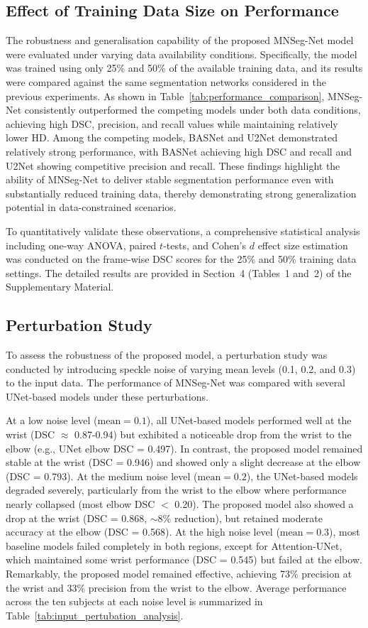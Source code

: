 \subsection{Effect of Training Data Size on Performance}
The robustness and generalisation capability of the proposed MNSeg-Net model were evaluated under varying data availability conditions. Specifically, the model was trained using only 25\% and 50\% of the available training data, and its results were compared against the same segmentation networks considered in the previous experiments. As shown in Table~\ref{tab:performance_comparison}, MNSeg-Net consistently outperformed the competing models under both data conditions, achieving high DSC, precision, and recall values while maintaining relatively lower HD. Among the competing models, BASNet and U2Net demonstrated relatively strong performance, with BASNet achieving high DSC and recall and U2Net showing competitive precision and recall. These findings highlight the ability of MNSeg-Net to deliver stable segmentation performance even with substantially reduced training data, thereby demonstrating strong generalization potential in data-constrained scenarios.

To quantitatively validate these observations, a comprehensive statistical
analysis including one-way ANOVA, paired $t$-tests, and Cohen’s $d$ effect size
estimation was conducted on the frame-wise DSC scores for the 25\% and 50\%
training data settings. The detailed results are provided in Section~4
(Tables~1 and~2) of the Supplementary Material.

\subsection{Perturbation Study}\label{sec:perturbation_study}

To assess the robustness of the proposed model, a perturbation study was conducted by introducing speckle noise of varying mean levels (0.1, 0.2, and 0.3) to the input data. The performance of MNSeg-Net was compared with several UNet-based models under these perturbations.

At a low noise level ($\text{mean}=0.1$), all UNet-based models performed well at the wrist (DSC $\approx$ 0.87-0.94) but exhibited a noticeable drop from the wrist to the elbow (e.g., UNet elbow DSC = 0.497). In contrast, the proposed model remained stable at the wrist (DSC = 0.946) and showed only a slight decrease at the elbow (DSC = 0.793). At the medium noise level ($\text{mean}=0.2$), the UNet-based models degraded severely, particularly from the wrist to the elbow where performance nearly collapsed (most elbow DSC $<$ 0.20). The proposed model also showed a drop at the wrist (DSC = 0.868, $\sim$8\% reduction), but retained moderate accuracy at the elbow (DSC = 0.568). At the high noise level ($\text{mean}=0.3$), most baseline models failed completely in both regions, except for Attention-UNet, which maintained some wrist performance (DSC = 0.545) but failed at the elbow. Remarkably, the proposed model remained effective, achieving 73\% precision at the wrist and 33\% precision from the wrist to the elbow. Average performance across the ten subjects at each noise level is summarized in Table~\ref{tab:input_pertubation_analysis}. 


